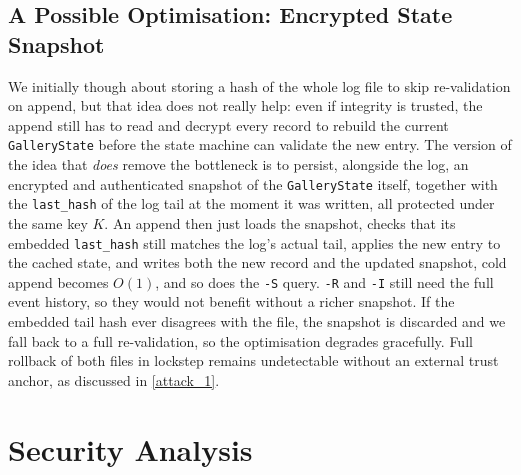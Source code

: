\documentclass[a4paper, 12pt]{article}
\begin{document}
    \subsection{A Possible Optimisation: Encrypted State Snapshot} \label{sec:state-snapshot}
    We initially though about storing a hash of the whole log file to skip re-validation on append, but that idea does not really help: even if integrity is trusted, the append still has to read and decrypt every record to rebuild the current \texttt{GalleryState} before the state machine can validate the new entry. The version of the idea that \emph{does} remove the bottleneck is to persist, alongside the log, an encrypted and authenticated snapshot of the \texttt{GalleryState} itself, together with the \texttt{last\_hash} of the log tail at the moment it was written, all protected under the same key $K$. An append then just loads the snapshot, checks that its embedded \texttt{last\_hash} still matches the log's actual tail, applies the new entry to the cached state, and writes both the new record and the updated snapshot, cold append becomes $O(1)$, and so does the \texttt{-S} query. \texttt{-R} and \texttt{-I} still need the full event history, so they would not benefit without a richer snapshot. If the embedded tail hash ever disagrees with the file, the snapshot is discarded and we fall back to a full re-validation, so the optimisation degrades gracefully. Full rollback of both files in lockstep remains undetectable without an external trust anchor, as discussed in \ref{attack_1}.

    \section{Security Analysis}
\end{document}
